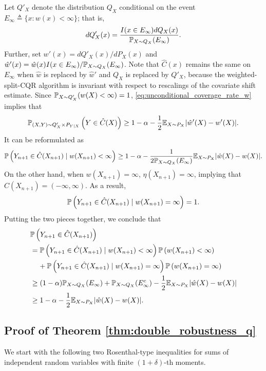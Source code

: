Let $Q'_{X}$ denote the distribution $Q_{X}$ conditional on the event $E_{\infty} \triangleq \{x: w(x) < \infty\}$; that is, 
\[dQ'_{X}(x) = \frac{I(x\in
    E_{\infty})dQ_{X}(x)}{\P_{X\sim Q_{X}}(E_{\infty})}.\] Further, set
$w'(x) = dQ'_{X}(x) / dP_{X}(x)$ and
$\hat{w}'(x) = \hat{w}(x)I(x \in E_{\infty}) / \P_{X\sim Q_{X}}(E_{\infty})$. Note
that $\hat{C}(x)$ remains the same on $E_{\infty}$ when $\hat{w}$ is
replaced by $\hat{w}'$ and $Q_{X}$ is replaced by $Q'_{X}$, because
the weighted-split-CQR algorithm is invariant with respect to
rescalings of the covariate shift estimate. Since
$\P_{X\sim Q'_{X}}(w(X) < \infty) = 1$, \eqref{eq:unconditional_coverage_rate_w}
implies that
\[\P_{(X, Y)\sim Q'_{X}\times P_{Y\mid X}}\lb Y\in \hat{C}(X)\rb\ge 1 - \alpha - \frac{1}{2}\E_{X\sim P_{X}}|\hat{w}'(X) - w'(X)|.\]
It can be reformulated as
\[\P\lb Y_{n+1}\in \hat{C}(X_{n+1})\mid w(X_{n+1}) < \infty\rb\ge 1 - \alpha - \frac{1}{2\P_{X\sim Q_{X}}(E_{\infty})}\E_{X\sim P_{X}}|\hat{w}(X) - w(X)|.\]
On the other hand, when $w(X_{n+1}) = \infty$, $\eta(X_{n+1}) = \infty$, implying that $\hat{C}(X_{n+1}) = (-\infty, \infty)$. As a result,
\[\P\lb Y_{n+1}\in \hat{C}(X_{n+1})\mid w(X_{n+1}) = \infty\rb = 1.\]
Putting the two pieces together, we conclude that
\begin{align*}
  & \P\lb Y_{n+1}\in \hat{C}(X_{n+1})\rb\\
  & \begin{multlined}
    = \P\lb Y_{n+1}\in \hat{C}(X_{n+1})\mid w(X_{n+1}) < \infty\rb \P\lb w(X_{n+1}) < \infty\rb\\
    + \P\lb Y_{n+1}\in \hat{C}(X_{n+1})\mid w(X_{n+1}) = \infty\rb \P\lb w(X_{n+1}) = \infty\rb
  \end{multlined}\\
  & \ge  (1 - \alpha)\P_{X\sim Q_{X}}(E_{\infty}) + \P_{X\sim Q_{X}}(E_{\infty}^{c}) - \frac{1}{2}\E_{X\sim P_{X}}|\hat{w}(X) - w(X)|\\
  & \ge 1 - \alpha - \frac{1}{2}\E_{X\sim P_{X}}|\hat{w}(X) - w(X)|.
\end{align*}


\subsection{Proof of Theorem \ref{thm:double_robustness_q}}

We start with the following two Rosenthal-type inequalities for sums of independent random variables with finite $(1 + \delta)$-th moments.

